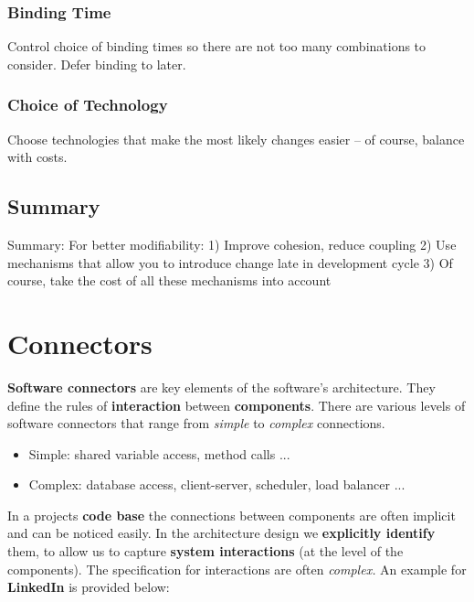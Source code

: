 \documentclass[a4paper]{article}
\begin{document}
\subsubsection{Binding Time}
Control choice of binding times so there are not too many combinations to consider. Defer binding to later.

\subsubsection{Choice of Technology} 
Choose technologies that make the most likely changes easier – of course, balance with costs.


\subsection{Summary}
Summary:
For better modifiability:
1) Improve cohesion, reduce coupling
2) Use mechanisms that allow you to introduce change late in development cycle
3) Of course, take the cost of all these mechanisms into account

\newpage
\section{Connectors}

\textbf{Software connectors} are key elements of the software's architecture. They define the rules of \textbf{interaction} between \textbf{components}. There are various levels of software connectors that range from \textit{simple} to \textit{complex} connections.
\begin{itemize}
\item Simple: shared variable access, method calls ...
\item Complex: database access, client-server, scheduler, load balancer ...\\
\end{itemize}

In a projects \textbf{code base} the connections between components are often implicit and can be noticed easily. In the architecture design we \textbf{explicitly identify} them, to allow us to capture \textbf{system interactions} (at the level of the components). The specification for interactions are often \textit{complex.} An example for \textbf{LinkedIn} is provided below:\\
\end{document}
